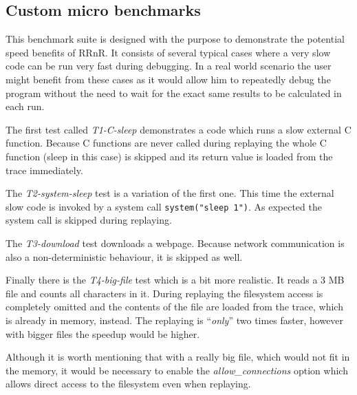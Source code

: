\documentclass[thesis=M,english,hidelinks]{FITthesis}[2012/10/20]
\newcommand*{\qt}[1]{\enquote{{\itshape#1}}}
\begin{document}
		\FloatBarrier
		\subsection{Custom micro benchmarks}
		This benchmark suite is designed with the purpose to demonstrate the potential speed benefits of RRnR. It consists of several typical cases where a very slow code can be run very fast during debugging. In a real world scenario the user might benefit from these cases as it would allow him to repeatedly debug the program without the need to wait for the exact same results to be calculated in each run.\par
		
		The first test called \emph{T1-C-sleep} demonstrates a code which runs a slow external C function. Because C functions are never called during replaying the whole C function (sleep in this case) is skipped and its return value is loaded from the trace immediately.\par
		
		The \emph{T2-system-sleep} test is a variation of the first one. This time the external slow code is invoked by a system call \lstinline|system("sleep 1")|. As expected the system call is skipped during replaying.\par
		
		The \emph{T3-download} test downloads a webpage. Because network communication is also a non-deterministic behaviour, it is skipped as well.\par
		
		Finally there is the \emph{T4-big-file} test which is a bit more realistic. It reads a 3 MB file and counts all characters in it. During replaying the filesystem access is completely omitted and the contents of the file are loaded from the trace, which is already in memory, instead. The replaying is \qt{only} two times faster, however with bigger files the speedup would be higher.\par
		
		Although it is worth mentioning that with a really big file, which would not fit in the memory, it would be necessary to enable the \emph{allow\_connections} option which allows direct access to the filesystem even when replaying.\par
		
\end{document}
